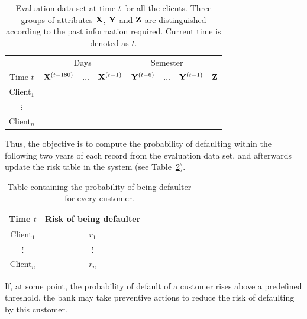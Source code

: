 \begin{itemize}
\begin{table}[ht!]
\centering
\begin{tabular}{c|ccc|ccc|c}
	&\multicolumn{3}{c|}{Days} & \multicolumn{3}{c|}{Semester} \\
     Time $t$              & $\mathbf{X}^{(t-180)}$ & $\ldots$ & $\mathbf{X}^{(t-1)} $ & $\mathbf{Y}^{(t-6)}$  & $\ldots$ & $\mathbf{Y}^{(t-1)} $ & $\mathbf{Z}$  \\  
\hline
Client$_1$  &                                                  &              &                     &                               &                     &        \\ 
$\vdots$      &                                                 &               &                     &                                &                     &      \\ 
Client$_n$  &                                                &               &                     &                                &                     &     \\ 
\end{tabular}
\caption{Evaluation data set at time $t$ for all the clients. Three groups of attributes $\mathbf{X}$, $\mathbf{Y}$ and $\mathbf{Z}$ are distinguished according to the past information required. Current time is denoted as $t$.}
\label{tab:EvaluationDataset} 
\end{table}

Thus, the objective is to compute the probability of defaulting within the following two years of each record from the evaluation data set, and afterwards update the risk table in the system (see Table~\ref{tab:riskTable}).

\begin{table}[ht!]
\centering
\begin{tabular}{c|ccc|ccc|c}
     Time $t$  & Risk of being defaulter \\  
\hline
Client$_1$  &    $r_1$  \\ 
$\vdots$      &   $\vdots$   \\ 
Client$_n$  &   $r_n$  \\ 
\end{tabular} 
\caption{Table containing the probability of being defaulter for every customer.}
\label{tab:riskTable}
\end{table}

If, at some point, the probability of default of a customer rises above a predefined threshold, the bank may take preventive actions to reduce the risk of defaulting by this customer.



\end{itemize}
